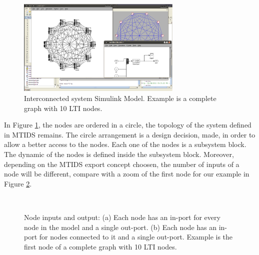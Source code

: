 \documentclass[a4paper,twoside, openright,12pt]{report}
\begin{document}
\begin{figure}[htb]
\centering
\includegraphics[width=0.7\textwidth]{pics/screenExportResult.eps}
\caption[MTIDS exported Simulink model]{Interconnected system Simulink Model. Example is a complete graph with 10 LTI nodes. }
\label{exportFig}
\end{figure}

In Figure \ref{exportFig}, the nodes are ordered in a circle, the topology of the system defined in MTIDS remains. The circle arrangement is a 
design decision, made, in order to allow a better access to the nodes. Each one of the nodes is a subsystem block. The dynamic of the nodes is defined inside
the subsystem block. Moreover, depending on the MTIDS export concept choosen, the number of inputs of a node will be different, compare with a zoom 
of the first node for our example in Figure \ref{nodeFig}. \\
 
\begin{figure}[htb]
\centering
\mbox{\quad
{}}
\caption[MTIDS node in Simulink]{Node inputs and output: (a) Each node has an in-port for every node in the model and a single out-port. 
(b) Each node has an in-port for nodes connected to it and a single out-port. Example is the first node of a complete graph with 10 LTI nodes. }
\label{nodeFig}
\end{figure}
\end{document}
